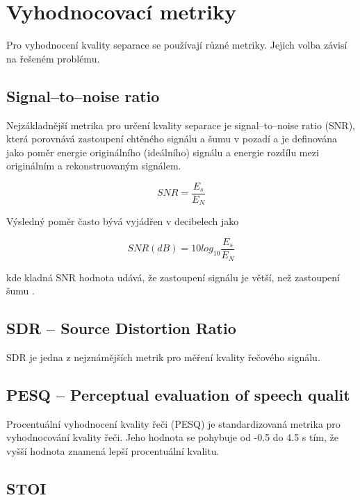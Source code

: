 \section{Vyhodnocovací metriky}
Pro vyhodnocení kvality separace se používají různé metriky. Jejich volba závisí na řešeném problému.


\subsection{Signal--to--noise ratio}

Nejzákladnější metrika pro určení kvality separace je signal--to--noise ratio (SNR), která porovnává zastoupení chtěného signálu a šumu v pozadí a je definována jako poměr energie originálního (ideálního) signálu a energie rozdílu mezi originálním a rekonstruovaným signálem.


\begin{equation}
  SNR = \frac{E_s}{E_N}
\end{equation}

Výsledný poměr často bývá vyjádřen v decibelech jako

\begin{equation}
  SNR(dB) = 10log_{10}\frac{E_s}{E_N}
\end{equation}

kde kladná SNR hodnota udává, že zastoupení signálu je větší, než zastoupení šumu .


\subsection{SDR -- Source Distortion Ratio}
SDR je jedna z nejznámějších metrik pro měření kvality řečového signálu.


\subsection{PESQ -- Perceptual evaluation of speech qualit}
Procentuální vyhodnocení kvality řeči (PESQ\cite{pesq-itut}) je standardizovaná metrika pro vyhodnocování kvality řeči. Jeho hodnota se pohybuje od -0.5 do 4.5 s tím, že vyšší hodnota znamená lepší procentuální kvalitu\cite{DBLP:journals/corr/abs-1901-09146}.


\subsection{STOI}

